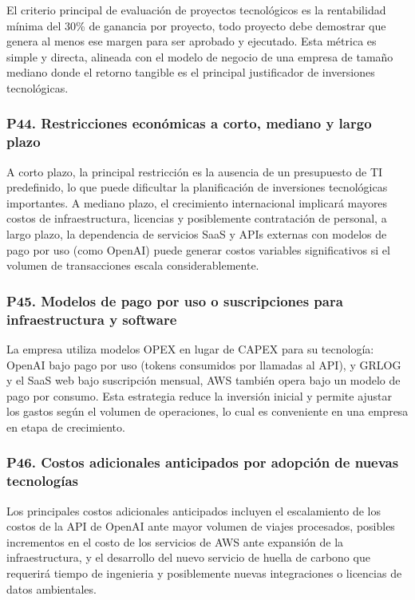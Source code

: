 \documentclass[12pt]{article}
\begin{document}
El criterio principal de evaluaci\'on de proyectos tecnol\'ogicos es la rentabilidad
m\'inima del 30\% de ganancia por proyecto, todo proyecto debe demostrar que genera al menos
ese margen para ser aprobado y ejecutado. Esta m\'etrica es simple y directa, alineada con
el modelo de negocio de una empresa de tama\~no mediano donde el retorno tangible es el
principal justificador de inversiones tecnol\'ogicas.

\subsubsection*{\textbf{P44. Restricciones econ\'omicas a corto, mediano y largo plazo}}

A corto plazo, la principal restricci\'on es la ausencia de un presupuesto de TI predefinido,
lo que puede dificultar la planificaci\'on de inversiones tecnol\'ogicas importantes. A
mediano plazo, el crecimiento internacional implicar\'a mayores costos de infraestructura,
licencias y posiblemente contrataci\'on de personal, a largo plazo, la dependencia de
servicios SaaS y APIs externas con modelos de pago por uso (como OpenAI) puede generar
costos variables significativos si el volumen de transacciones escala considerablemente.

\subsubsection*{\textbf{P45. Modelos de pago por uso o suscripciones para infraestructura y software}}

La empresa utiliza modelos OPEX en lugar de CAPEX para su tecnolog\'ia: OpenAI
bajo pago por uso (tokens consumidos por llamadas al API), y GRLOG y el SaaS
web bajo suscripci\'on mensual, AWS tambi\'en opera bajo un modelo de pago por consumo.
Esta estrategia reduce la inversi\'on inicial y permite ajustar los gastos seg\'un el
volumen de operaciones, lo cual es conveniente en una empresa en etapa de crecimiento.

\subsubsection*{\textbf{P46. Costos adicionales anticipados por adopci\'on de nuevas tecnolog\'ias}}

Los principales costos adicionales anticipados incluyen el escalamiento de los costos
de la API de OpenAI ante mayor volumen de viajes procesados, posibles incrementos
en el costo de los servicios de AWS ante expansi\'on de la infraestructura,
y el desarrollo del nuevo servicio de huella de carbono que requerir\'a tiempo
de ingenieria y posiblemente nuevas integraciones o licencias de datos ambientales.
\end{document}
